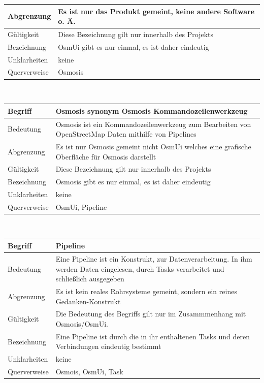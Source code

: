 \documentclass[a4paper,12pt]{scrartcl}
\begin{document}
\begin{center}
\begin{tabular}{|p{5cm}|p{10cm}|}
\hline Abgrenzung & Es ist nur das Produkt gemeint, keine andere Software o. Ä. \\ 
\hline Gültigkeit & Diese Bezeichnung gilt nur innerhalb des Projekts \\ 
\hline Bezeichnung & OsmUi gibt es nur einmal, es ist daher eindeutig \\ 
\hline Unklarheiten & keine \\ 
\hline Querverweise & Osmosis \\ 
\hline 
\end{tabular}
\vspace{0.7cm}
\\
\begin{tabular}{|p{5cm}|p{10cm}|}
\hline Begriff & \textbf{Osmosis} synonym Osmosis Kommandozeilenwerkzeug\\ 
\hline Bedeutung & Osmosis ist ein Kommandozeilenwerkzeug zum Bearbeiten von OpenStreetMap Daten mithilfe von Pipelines \\ 
\hline Abgrenzung & Es ist nur Osmosis gemeint nicht OsmUi welches eine grafische Oberfläche für Osmosis darstellt\\ 
\hline Gültigkeit & Diese Bezeichnung gilt nur innerhalb des Projekts \\ 
\hline Bezeichnung & Osmosis gibt es nur einmal, es ist daher eindeutig \\ 
\hline Unklarheiten & keine \\ 
\hline Querverweise & OsmUi, Pipeline \\ 
\hline 
\end{tabular}
\vspace{0.7cm}
\\
\begin{tabular}{|p{5cm}|p{10cm}|}
\hline Begriff & \textbf{Pipeline} \\ 
\hline Bedeutung & Eine Pipeline ist ein Konstrukt, zur Datenverarbeitung. In ihm werden Daten eingelesen, durch Tasks verarbeitet und schließlich ausgegeben\\ 
\hline Abgrenzung & Es ist kein reales Rohrsysteme gemeint, sondern ein reines Gedanken-Konstrukt \\ 
\hline Gültigkeit & Die Bedeutung des Begriffs gilt nur im Zusammmenhang mit Osmosis/OsmUi. \\ 
\hline Bezeichnung & Eine Pipeline ist durch die in ihr enthaltenen Tasks und deren Verbindungen eindeutig bestimmt \\ 
\hline Unklarheiten & keine \\ 
\hline Querverweise & Osmois, OsmUi, Task \\ 

\end{tabular}
\end{center}
\end{document}
